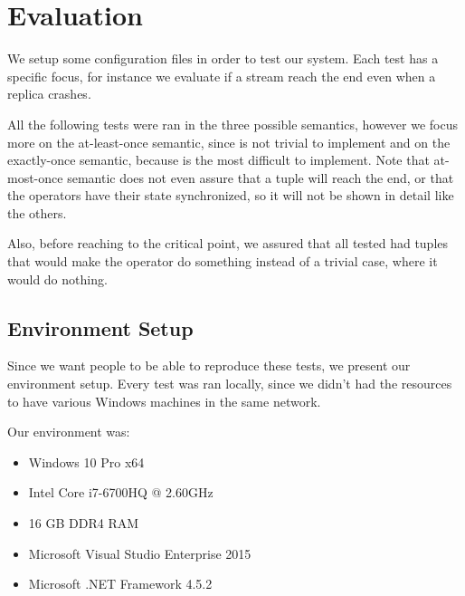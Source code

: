 \documentclass[times, 10pt,twocolumn]{article}
\begin{document}
\section{Evaluation}

We setup some configuration files in order to test our system. Each test 
has a specific focus, for instance we evaluate if a stream reach the end even when 
a replica crashes.

All the following tests were ran in the three possible semantics, however we focus more on the at-least-once semantic, since is not trivial to implement and on the exactly-once semantic, because is the most difficult to implement. Note that at-most-once semantic does not even assure that a tuple will reach the end, or that the operators have their state synchronized, so it will not be shown in detail like the others. 

Also, before reaching to the critical point, we assured that all tested had tuples that would make the operator do something instead of a trivial case, where it would do nothing.

\subsection{Environment Setup}
Since we want people to be able to reproduce these tests, we present our environment setup. Every test
was ran locally, since we didn't had the resources to have various Windows machines in the same network.

Our environment was:
\begin{itemize}
	\item Windows 10 Pro x64
	\item Intel Core i7-6700HQ @ 2.60GHz
	\item 16 GB DDR4 RAM
	\item Microsoft Visual Studio Enterprise 2015
	\item Microsoft .NET Framework 4.5.2
\end{itemize}
\end{document}
